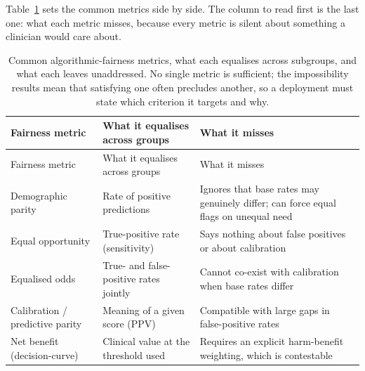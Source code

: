 \documentclass[
  letterpaper,
  11pt]{scrbook}
\begin{document}
Table~\ref{tbl-fairness-metrics} sets the common metrics side by side.
The column to read first is the last one: what each metric misses,
because every metric is silent about something a clinician would care
about.

\begin{longtable}[]{@{}
  >{\raggedright\arraybackslash}p{}
  >{\raggedright\arraybackslash}p{}
  >{\raggedright\arraybackslash}p{}@{}}
\caption{Common algorithmic-fairness metrics, what each equalises across
subgroups, and what each leaves unaddressed. No single metric is
sufficient; the impossibility results mean that satisfying one often
precludes another, so a deployment must state which criterion it targets
and why.}\label{tbl-fairness-metrics}\tabularnewline
\toprule\noalign{}
\begin{minipage}[b]{\linewidth}\raggedright
Fairness metric
\end{minipage} & \begin{minipage}[b]{\linewidth}\raggedright
What it equalises across groups
\end{minipage} & \begin{minipage}[b]{\linewidth}\raggedright
What it misses
\end{minipage} \\
\midrule\noalign{}
\endfirsthead
\toprule\noalign{}
\begin{minipage}[b]{\linewidth}\raggedright
Fairness metric
\end{minipage} & \begin{minipage}[b]{\linewidth}\raggedright
What it equalises across groups
\end{minipage} & \begin{minipage}[b]{\linewidth}\raggedright
What it misses
\end{minipage} \\
\midrule\noalign{}
\endhead
\bottomrule\noalign{}
\endlastfoot
Demographic parity & Rate of positive predictions & Ignores that base
rates may genuinely differ; can force equal flags on unequal need \\
Equal opportunity & True-positive rate (sensitivity) & Says nothing
about false positives or about calibration \\
Equalised odds & True- and false-positive rates jointly & Cannot
co-exist with calibration when base rates differ \\
Calibration / predictive parity & Meaning of a given score (PPV) &
Compatible with large gaps in false-positive rates \\
Net benefit (decision-curve) & Clinical value at the threshold used &
Requires an explicit harm-benefit weighting, which is contestable \\
\end{longtable}
\end{document}

